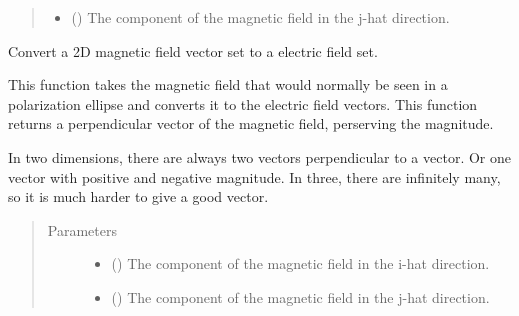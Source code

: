 \documentclass[letterpaper,10pt,english]{sphinxmanual}
\begin{document}
\begin{fulllineitems}
\begin{quote}
\begin{description}
\begin{itemize}
\item {} 
 () \textendash{} The component of the magnetic field in the j-hat direction.

\end{itemize}


\end{description}\end{quote}

\end{fulllineitems}


\begin{fulllineitems}
\label{\detokenize{Backend.electromagnetic_field_polarization:Backend.electromagnetic_field_polarization.magnetic_to_electric}}
Convert a 2D magnetic field vector set to a electric field set.

This function takes the magnetic field that would normally be seen
in a polarization ellipse and converts it to the electric field
vectors. This function returns a perpendicular vector of the
magnetic field, perserving the magnitude.

In two dimensions, there are always two vectors perpendicular to a vector.
Or one vector with positive and negative magnitude. In three, there are
infinitely many, so it is much harder to give a good vector.
\begin{quote}\begin{description}
\item[{Parameters}] \leavevmode\begin{itemize}
\item {} 
 () \textendash{} The component of the magnetic field in the i-hat direction.

\item {} 
 () \textendash{} The component of the magnetic field in the j-hat direction.


\end{itemize}
\end{description}
\end{quote}
\end{fulllineitems}
\end{document}
